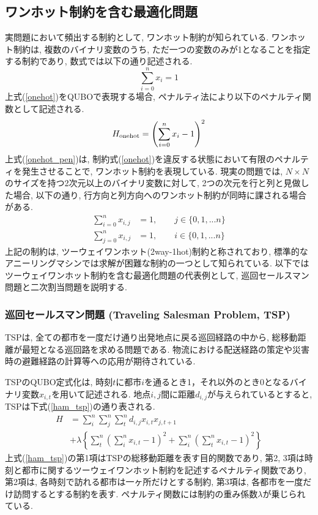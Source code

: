 \documentclass[submit,techrep,noauthor]{ipsj}
\begin{document}
\subsection{ワンホット制約を含む最適化問題}
実問題において頻出する制約として, ワンホット制約が知られている. ワンホット制約は, 複数のバイナリ変数のうち, ただ一つの変数のみが1となることを指定する制約であり, 数式では以下の通り記述される.
\begin{equation}
\sum_{i=0}^{n}x_{i} = 1 \label{onehot}
\end{equation}
上式(\ref{onehot})をQUBOで表現する場合, ペナルティ法により以下のペナルティ関数として記述される.
\begin{equation}
H_{{\rm onehot}}=\left(\sum_{i=0}^{n}x_{i} - 1\right)^{2} \label{onehot_pen}
\end{equation}
上式(\ref{onehot_pen})は, 制約式(\ref{onehot})を違反する状態において有限のペナルティを発生させることで, ワンホット制約を表現している. 現実の問題では, $N\times N$のサイズを持つ2次元以上のバイナリ変数に対して, 2つの次元を行と列と見做した場合, 以下の通り, 行方向と列方向へのワンホット制約が同時に課される場合がある.
\begin{align}
\sum_{i=0}^{n}x_{i, j} &= 1,\hspace{2em}j\in\{0,1,...n\}\\
\sum_{j=0}^{n}x_{i, j} &= 1,\hspace{2em}i\in\{0,1,...n\}
\end{align}
上記の制約は, ツーウェイワンホット(2way-1hot)制約と称されており\cite{yatabe}, 標準的なアニーリングマシンでは求解が困難な制約の一つとして知られている\cite{da3}. 以下ではツーウェイワンホット制約を含む最適化問題の代表例として, 巡回セールスマン問題と二次割当問題を説明する.

\subsubsection{巡回セールスマン問題 (Traveling Salesman Problem, TSP)}
TSPは, 全ての都市を一度だけ通り出発地点に戻る巡回経路の中から, 総移動距離が最短となる巡回路を求める問題である. 物流における配送経路の策定や災害時の避難経路の計算等への応用が期待されている. 

TSPのQUBO定式化は, 時刻$t$に都市$i$を通るとき1，それ以外のとき0となるバイナリ変数$x_{i,t}$を用いて記述される. 
地点$i, j$間に距離$d_{i, j}$が与えられているとすると, TSPは下式(\ref{ham_tsp})の通り表される.
\begin{align}
H &= \sum_{i}^{n}\sum_{j}^{n}\sum_{t}^{n}d_{i,j}x_{i,t}x_{j,t+1}\nonumber\\
&+\lambda\left\{\sum_{t}^{n}\left(\sum_{i}^{n}x_{i,t}-1\right)^{2} + \sum_{i}^{n}\left(\sum_{t}^{n}x_{i,t}-1\right)^{2}\right\} \label{ham_tsp}
\end{align}
上式(\ref{ham_tsp})の第1項はTSPの総移動距離を表す目的関数であり, 第2, 3項は時刻と都市に関するツーウェイワンホット制約を記述するペナルティ関数であり, 第2項は, 各時刻で訪れる都市は一ヶ所だけとする制約, 第3項は, 各都市を一度だけ訪問するとする制約を表す. ペナルティ関数には制約の重み係数$\lambda$が乗じられている. 
\end{document}
